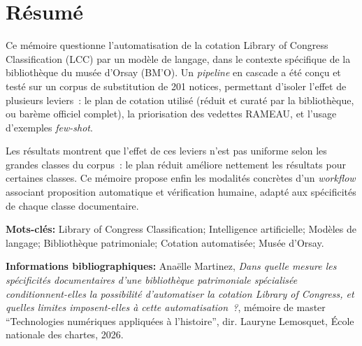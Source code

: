 \documentclass[12pt,twoside]{book}
\begin{document}
	\thispagestyle{empty}	
	\cleardoublepage
	
\frontmatter

	\chapter{Résumé}
\medskip
	
	Ce mémoire questionne l'automatisation de la cotation Library of Congress Classification (LCC) par un modèle de langage, dans le contexte spécifique de la bibliothèque du musée d'Orsay (BM'O). Un \textit{pipeline} en cascade a été conçu et testé sur un corpus de substitution de 201 notices, permettant d'isoler l'effet de plusieurs leviers~: le plan de cotation utilisé (réduit et curaté par la bibliothèque, ou barème officiel complet), la priorisation des vedettes RAMEAU, et l'usage d'exemples \textit{few-shot}.

	Les résultats montrent que l'effet de ces leviers n'est pas uniforme selon les grandes classes du corpus~: le plan réduit améliore nettement les résultats pour certaines classes. Ce mémoire propose enfin les modalités concrètes d'un \textit{workflow} associant proposition automatique et vérification humaine, adapté aux spécificités de chaque classe documentaire.

	\textbf{Mots-clés:} Library of Congress Classification; Intelligence artificielle; Modèles de langage; Bibliothèque patrimoniale; Cotation automatisée; Musée d'Orsay.\newline

	\textbf{Informations bibliographiques:} Anaëlle Martinez, \textit{Dans quelle mesure les spécificités documentaires d'une bibliothèque patrimoniale spécialisée conditionnent-elles la possibilité d'automatiser la cotation Library of Congress, et quelles limites imposent-elles à cette automatisation~?}, mémoire de master \enquote{Technologies numériques appliquées à l'histoire}, dir. Lauryne Lemosquet, École nationale des chartes, 2026.
\end{document}
